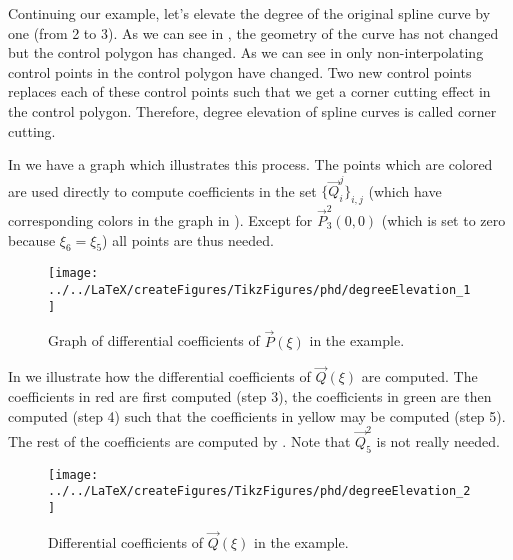 Continuing our example, let's elevate the degree of the original spline curve by one (from 2 to 3). As we can see in , the geometry of the curve has not changed but the control polygon has changed. As we can see in  only non-interpolating control points in the control polygon have changed. Two new control points replaces each of these control points such that we get a corner cutting effect in the control polygon. Therefore, degree elevation of spline curves is called corner cutting. 

In  we have a graph which illustrates this process. The points which are colored are used directly to compute coefficients in the set $\{\vec{Q}_i^j\}_{i,j}$ (which have corresponding colors in the graph in ). Except for $\vec{P}_3^2(0,0)$ (which is set to zero because $\xi_6 = \xi_5$) all points are thus needed.

\begin{figure}
	\centering
	\texttt{[image: ../../LaTeX/createFigures/TikzFigures/phd/degreeElevation\_1]}
	\caption{Graph of differential coefficients of $\vec{P}(\xi)$ in the example.}
	\label{Fig:graphDiffCoeff1}
\end{figure}
In  we illustrate how the differential coefficients of $\vec{Q}(\xi)$ are computed. The coefficients in red are first computed (step 3), the coefficients in green are then computed (step 4) such that the coefficients in yellow may be computed (step 5). The rest of the coefficients are computed by . Note that $\vec{Q}_5^2$ is not really needed.
\begin{figure}
	\centering
	\texttt{[image: ../../LaTeX/createFigures/TikzFigures/phd/degreeElevation\_2]}
	\caption{Differential coefficients of $\vec{Q}(\xi)$ in the example.}
	\label{Fig:graphDiffCoeff2}
\end{figure}
\newpage
